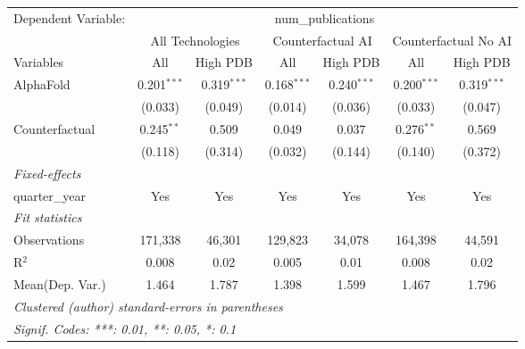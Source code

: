 \begingroup
\centering
\begin{tabular}{lcccccc}
   \tabularnewline \midrule \midrule
   Dependent Variable: & \multicolumn{6}{c}{num\_publications}\\
 & \multicolumn{2}{c}{All Technologies} & \multicolumn{2}{c}{Counterfactual AI} & \multicolumn{2}{c}{Counterfactual No AI} \\
\cmidrule(lr){1-1}\cmidrule(lr){2-3} \cmidrule(lr){4-5} \cmidrule(lr){6-7}
Variables & \multicolumn{1}{c}{All} & \multicolumn{1}{c}{High PDB} & \multicolumn{1}{c}{All} & \multicolumn{1}{c}{High PDB} & \multicolumn{1}{c}{All} & \multicolumn{1}{c}{High PDB} \\
\cmidrule(lr){1-1}\cmidrule(lr){2-2} \cmidrule(lr){3-3} \cmidrule(lr){4-4} \cmidrule(lr){5-5} \cmidrule(lr){6-6} \cmidrule(lr){7-7}
   AlphaFold      & 0.201$^{***}$ & 0.319$^{***}$ & 0.168$^{***}$ & 0.240$^{***}$ & 0.200$^{***}$ & 0.319$^{***}$\\   
                  & (0.033)       & (0.049)       & (0.014)       & (0.036)       & (0.033)       & (0.047)\\   
   Counterfactual & 0.245$^{**}$  & 0.509         & 0.049         & 0.037         & 0.276$^{**}$  & 0.569\\   
                  & (0.118)       & (0.314)       & (0.032)       & (0.144)       & (0.140)       & (0.372)\\   
   \midrule
   \emph{Fixed-effects}\\
   quarter\_year  & Yes           & Yes           & Yes           & Yes           & Yes           & Yes\\  
   \midrule
   \emph{Fit statistics}\\
   Observations   & 171,338       & 46,301        & 129,823       & 34,078        & 164,398       & 44,591\\  
   R$^2$          & 0.008         & 0.02          & 0.005         & 0.01          & 0.008         & 0.02\\  
Mean(Dep. Var.) & 1.464 & 1.787 & 1.398 & 1.599 & 1.467 & 1.796 \\
   \midrule \midrule
   \multicolumn{7}{l}{\emph{Clustered (author) standard-errors in parentheses}}\\
   \multicolumn{7}{l}{\emph{Signif. Codes: ***: 0.01, **: 0.05, *: 0.1}}\\
\end{tabular}
\par\endgroup
